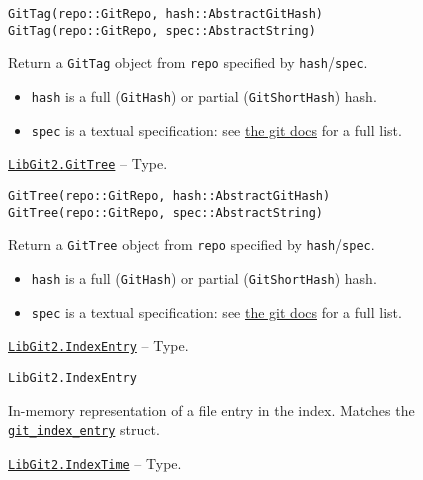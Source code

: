 \begin{adjustwidth}{2em}{0pt}


\begin{verbatim}
GitTag(repo::GitRepo, hash::AbstractGitHash)
GitTag(repo::GitRepo, spec::AbstractString)
\end{verbatim}

Return a \texttt{GitTag} object from \texttt{repo} specified by \texttt{hash}/\texttt{spec}.

\begin{itemize}
\item \texttt{hash} is a full (\texttt{GitHash}) or partial (\texttt{GitShortHash}) hash.


\item \texttt{spec} is a textual specification: see \href{https://git-scm.com/docs/git-rev-parse.html\#\_specifying\_revisions}{the git docs} for a full list.

\end{itemize}


\end{adjustwidth}
\hypertarget{6242150303858692069}{}
\hyperlink{6242150303858692069}{\texttt{LibGit2.GitTree}}  -- {Type.}

\begin{adjustwidth}{2em}{0pt}


\begin{verbatim}
GitTree(repo::GitRepo, hash::AbstractGitHash)
GitTree(repo::GitRepo, spec::AbstractString)
\end{verbatim}

Return a \texttt{GitTree} object from \texttt{repo} specified by \texttt{hash}/\texttt{spec}.

\begin{itemize}
\item \texttt{hash} is a full (\texttt{GitHash}) or partial (\texttt{GitShortHash}) hash.


\item \texttt{spec} is a textual specification: see \href{https://git-scm.com/docs/git-rev-parse.html\#\_specifying\_revisions}{the git docs} for a full list.

\end{itemize}


\end{adjustwidth}
\hypertarget{2169451189682045075}{}
\hyperlink{2169451189682045075}{\texttt{LibGit2.IndexEntry}}  -- {Type.}

\begin{adjustwidth}{2em}{0pt}


\begin{verbatim}
LibGit2.IndexEntry
\end{verbatim}

In-memory representation of a file entry in the index. Matches the \href{https://libgit2.org/libgit2/\#HEAD/type/git\_index\_entry}{\texttt{git\_index\_entry}} struct.



\end{adjustwidth}
\hypertarget{13894240843968539685}{}
\hyperlink{13894240843968539685}{\texttt{LibGit2.IndexTime}}  -- {Type.}


